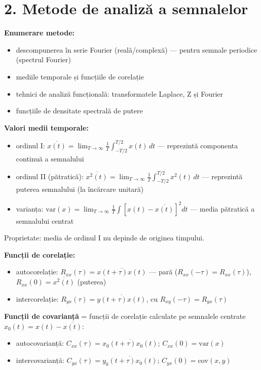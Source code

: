 \documentclass[10pt,a4paper]{article}
\begin{document}
\section*{2. Metode de analiză a semnalelor}
\textbf{Enumerare metode:}
\begin{itemize}
\item descompunerea în serie Fourier (reală/complexă) — pentru semnale periodice (spectrul Fourier)
\item mediile temporale și funcțiile de corelație
\item tehnici de analiză funcțională: transformatele Laplace, Z și Fourier
\item funcțiile de densitate spectrală de putere
\end{itemize}

\textbf{Valori medii temporale:}
\begin{itemize}
\item ordinul I: $\overline{x(t)}=\lim_{T\to\infty}\frac{1}{T}\int_{-T/2}^{T/2}x(t)\,dt$ — reprezintă componenta continuă a semnalului
\item ordinul II (pătratică): $\overline{x^2(t)}=\lim_{T\to\infty}\frac{1}{T}\int_{-T/2}^{T/2}x^2(t)\,dt$ — reprezintă puterea semnalului (la încărcare unitară)
\item varianța: $\mathrm{var}(x)=\lim_{T\to\infty}\frac{1}{T}\int[x(t)-\overline{x(t)}]^2dt$ — media pătratică a semnalului centrat
\end{itemize}
Proprietate: media de ordinul I nu depinde de originea timpului.

\textbf{Funcții de corelație:}
\begin{itemize}
\item autocorelație: $R_{xx}(\tau)=\overline{x(t+\tau)x(t)}$ — pară ($R_{xx}(-\tau)=R_{xx}(\tau)$), $R_{xx}(0)=\overline{x^2(t)}$ (puterea)
\item intercorelație: $R_{yx}(\tau)=\overline{y(t+\tau)x(t)}$, cu $R_{xy}(-\tau)=R_{yx}(\tau)$
\end{itemize}

\textbf{Funcții de covarianță} = funcții de corelație calculate pe semnalele centrate $x_0(t)=x(t)-\overline{x(t)}$:
\begin{itemize}
\item autocovarianță: $C_{xx}(\tau)=\overline{x_0(t+\tau)x_0(t)}$; $C_{xx}(0)=\mathrm{var}(x)$
\item intercovarianță: $C_{yx}(\tau)=\overline{y_0(t+\tau)x_0(t)}$; $C_{yx}(0)=\mathrm{cov}(x,y)$
\end{itemize}
\end{document}
